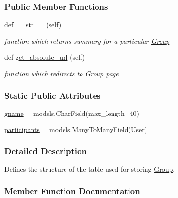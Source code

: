 \subsubsection*{Public Member Functions}
\begin{DoxyCompactItemize}
\item 
def \hyperlink{classsplit_1_1models_1_1Group_ade238f7828b4bbf7b4812a27c5a37c61}{\+\_\+\+\_\+str\+\_\+\+\_\+} (self)
\begin{DoxyCompactList}\small\item\em function which returns summary for a particular \hyperlink{classsplit_1_1models_1_1Group}{Group} \end{DoxyCompactList}\item 
def \hyperlink{classsplit_1_1models_1_1Group_a8bf6efa6c71f8386d6cd47ee6b46b78e}{get\+\_\+absolute\+\_\+url} (self)
\begin{DoxyCompactList}\small\item\em function which redirects to \hyperlink{classsplit_1_1models_1_1Group}{Group} page \end{DoxyCompactList}\end{DoxyCompactItemize}
\subsubsection*{Static Public Attributes}
\begin{DoxyCompactItemize}
\item 
\hyperlink{classsplit_1_1models_1_1Group_ab9568485e4656ffbca69cd5892bd41a7}{gname} = models.\+Char\+Field(max\+\_\+length=40)
\item 
\hyperlink{classsplit_1_1models_1_1Group_a42de37203e399e2273ab1d968585d06d}{participants} = models.\+Many\+To\+Many\+Field(User)
\end{DoxyCompactItemize}


\subsubsection{Detailed Description}
Defines the structure of the table used for storing \hyperlink{classsplit_1_1models_1_1Group}{Group}. 

\subsubsection{Member Function Documentation}
\mbox{\label{classsplit_1_1models_1_1Group_ade238f7828b4bbf7b4812a27c5a37c61}} 
